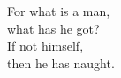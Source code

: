 \vspace{2in}
\begin{flushright}
{%
For what is a man,\\
what has he got? \\
If not himself, \\
then he has naught.
}
\end{flushright}


